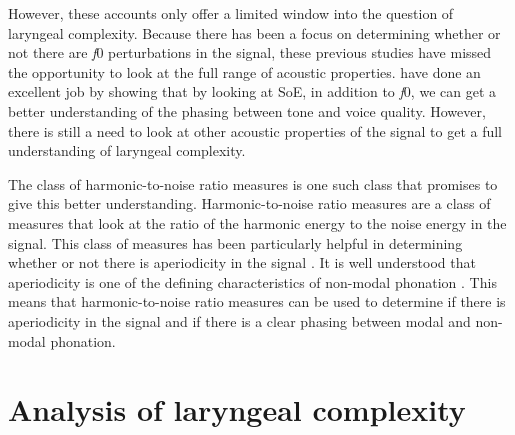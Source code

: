 However, these accounts only offer a limited window into the question of laryngeal complexity. Because there has been a focus on determining whether or not there are \textit{f}0 perturbations in the signal, these previous studies have missed the opportunity to look at the full range of acoustic properties. \citet{wellerInteractionsToneGlottalization2023,wellerLexicalToneVowel2023,wellerVoiceQualityTone2024} have done an excellent job by showing that by looking at SoE, in addition to \textit{f}0, we can get a better understanding of the phasing between tone and voice quality. However, there is still a need to look at other acoustic properties of the signal to get a full understanding of laryngeal complexity. 

The class of harmonic-to-noise ratio measures is one such class that promises to give this better understanding. Harmonic-to-noise ratio measures are a class of measures that look at the ratio of the harmonic energy to the noise energy in the signal. This class of measures has been particularly helpful in determining whether or not there is aperiodicity in the signal \citep{dekromCepstrumBasedTechniqueDetermining1993,ferrerriesgoWhatMakesCepstral2020,garellekPhoneticsVoice2019}. It is well understood that aperiodicity is one of the defining characteristics of non-modal phonation \citep{ladefogedSoundsWorldsLanguages1996}. This means that harmonic-to-noise ratio measures can be used to determine if there is aperiodicity in the signal and if there is a clear phasing between modal and non-modal phonation.


\section{Analysis of laryngeal complexity}\label{sec:analysis_of_lc}



